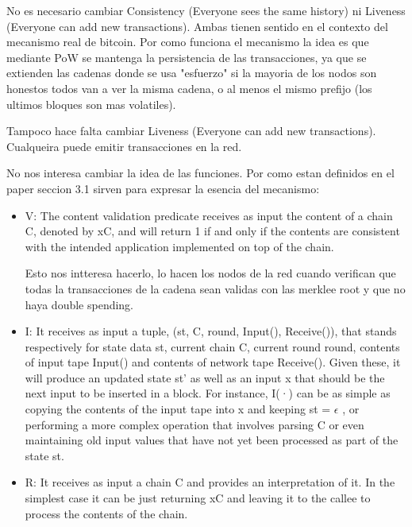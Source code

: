 \documentclass[12pt,addpoints,answers]{exam}
\begin{document}
\begin{questions}
\begin{parts}
\begin{solution}
        No es necesario cambiar Consistency (Everyone sees the same history) ni Liveness (Everyone can add new transactions). Ambas
        tienen sentido en el contexto del mecanismo real de bitcoin. Por como funciona el mecanismo la idea es que mediante PoW 
        se mantenga la persistencia de las transacciones, ya que se extienden las cadenas donde se usa "esfuerzo" si la mayoria
        de los nodos son honestos todos van a ver la misma cadena, o al menos el mismo prefijo (los ultimos bloques son mas volatiles).

        Tampoco hace falta cambiar Liveness (Everyone can add new transactions). Cualqueira puede emitir transacciones en la red.
        
        No nos interesa cambiar la idea de las funciones. Por como estan definidos en el paper seccion 3.1 sirven
        para expresar la esencia del mecanismo:

        \begin{itemize}
            \item{V: The content validation predicate receives as input the
            content of a chain C, denoted by xC, and will return 1 if and only if the contents are consistent
            with the intended application implemented on top of the chain.
            
            Esto nos intteresa hacerlo, lo hacen los nodos de la red cuando verifican que todas la transacciones de la cadena
            sean validas  con las merklee root y que no haya double spending.
            }
            \item{I: It receives as input a tuple, (st, C, round, Input(), Receive()),
            that stands respectively for state data st, current chain C, current round round, contents of
            input tape Input() and contents of network tape Receive(). Given these, it will produce
            an updated state st' as well as an input x that should be the next input to be inserted in a
            block. For instance, I(·) can be as simple as copying the contents of the input tape into x
            and keeping st = $\epsilon$ , or performing a more complex operation that involves parsing C or even
            maintaining old input values that have not yet been processed as part of the state st.}

            \item{R: It receives as input a chain C and provides an interpretation of it. 
            In the simplest case it can be just returning xC and leaving it to the callee to process the contents of the chain.
            
}
\end{itemize}
\end{solution}
\end{parts}
\end{questions}
\end{document}
